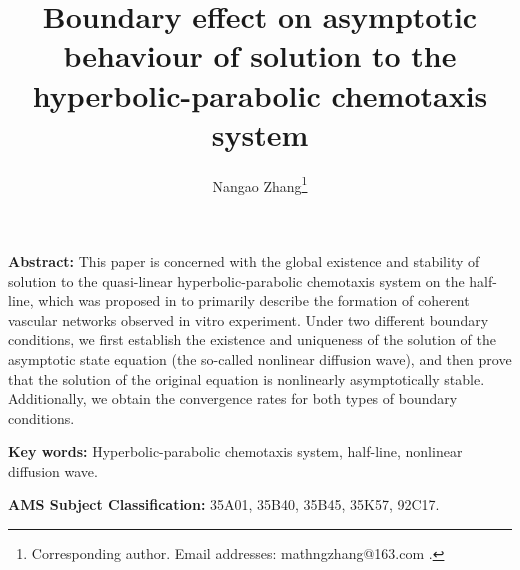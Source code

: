 \documentclass[11pt]{article}
\theoremstyle{plain}
\numberwithin{equation}{section}
\begin{document}
	
	\title{{\bf {Boundary effect on asymptotic behaviour of solution to the hyperbolic-parabolic chemotaxis system}}}
	
	
	\author{Nangao Zhang\thanks{Corresponding author. \authorcr Email addresses:
			mathngzhang@163.com
			.}}
	
	\date{}
	
	\maketitle
	
	\textbf{{\bf Abstract:}} 
	This paper  is concerned with the global existence and stability of solution to the quasi-linear hyperbolic-parabolic chemotaxis system on the half-line, which was proposed in \cite{Ambrosi1} to primarily describe the formation of coherent vascular networks observed in vitro experiment. 
	Under two different boundary conditions, we first establish the existence and uniqueness of the solution of the asymptotic state equation (the so-called nonlinear diffusion wave), and then prove that the solution of the original equation is nonlinearly asymptotically stable. 
	Additionally, we obtain the convergence rates for both types of boundary conditions.
	
	
	\bigbreak \textbf{{\bf Key words}:}  Hyperbolic-parabolic chemotaxis system, half-line, nonlinear diffusion wave.
	
	\bigbreak \textbf{{\bf AMS Subject Classification}:} 35A01, 35B40, 35B45, 35K57, 92C17.
	
	\tableofcontents
\end{document}
